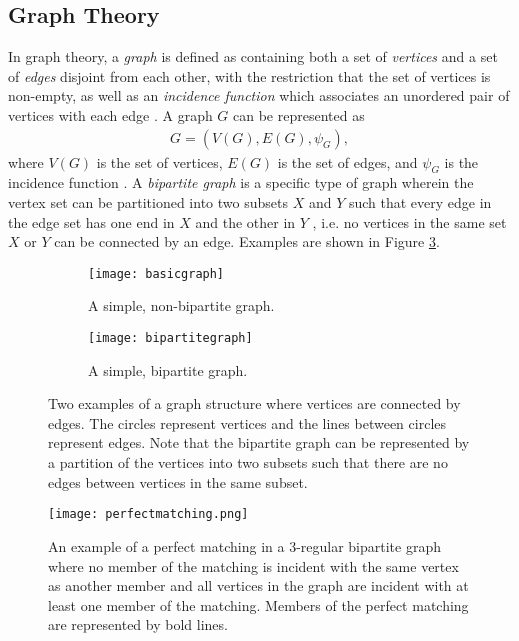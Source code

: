 \subsection{Graph Theory}

In graph theory, a \textit{graph} is defined as containing both a set of \textit{vertices} and a set of \textit{edges} disjoint from each other, with the restriction that the set of vertices is non-empty, as well as an \textit{incidence function} which associates an unordered pair of vertices with each edge \citep{Bondy1976}. A graph $G$ can be represented as
\begin{align*}
    G = (V(G), E(G), \psi_{G}),
\end{align*}
where $V(G)$ is the set of vertices, $E(G)$ is the set of edges, and $\psi_{G}$ is the incidence function \citep{Bondy1976}. A \textit{bipartite graph} is a specific type of graph wherein the vertex set can be partitioned into two subsets $X$ and $Y$ such that every edge in the edge set has one end in $X$ and the other in $Y$ \citep{Bondy1976}, i.e. no vertices in the same set $X$ or $Y$ can be connected by an edge. Examples are shown in Figure \ref{fig:graphs}.

    \begin{figure}[t]
    \centering
    \begin{subfigure}{.5\textwidth}
        \centering
        \texttt{[image: basicgraph]}
        \caption{A simple, non-bipartite graph.}
        \label{fig:simplegraph}
    \end{subfigure}%
    \begin{subfigure}{.5\textwidth}
        \centering
        \texttt{[image: bipartitegraph]}
        \caption{A simple, bipartite graph.}
        \label{fig:bipartitegraph}
    \end{subfigure}
    \caption{Two examples of a graph structure where vertices are connected by edges. The circles represent vertices and the lines between circles represent edges. Note that the bipartite graph can be represented by a partition of the vertices into two subsets such that there are no edges between vertices in the same subset.}
    \label{fig:graphs}
    \end{figure}

\begin{figure}[t]
    \centering
    \texttt{[image: perfectmatching.png]}
    \caption{An example of a perfect matching in a 3-regular bipartite graph where no member of the matching is incident with the same vertex as another member and all vertices in the graph are incident with at least one member of the matching. Members of the perfect matching are represented by bold lines.}
    \label{fig:perfectmatching}
\end{figure}

